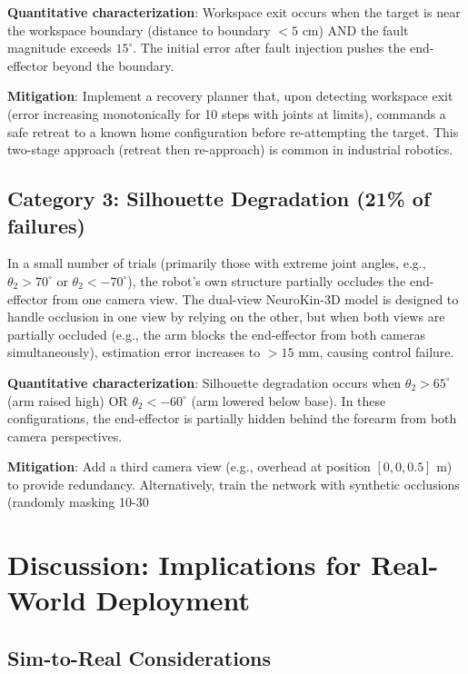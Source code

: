 \documentclass[12pt,a4paper,oneside]{report}
\begin{document}
\textbf{Quantitative characterization}: Workspace exit occurs when the target is near the workspace boundary (distance to boundary $< 5$ cm) AND the fault magnitude exceeds $15^\circ$. The initial error after fault injection pushes the end-effector beyond the boundary.

\textbf{Mitigation}: Implement a recovery planner that, upon detecting workspace exit (error increasing monotonically for 10 steps with joints at limits), commands a safe retreat to a known home configuration before re-attempting the target. This two-stage approach (retreat then re-approach) is common in industrial robotics.

\subsection{Category 3: Silhouette Degradation (21\% of failures)}

In a small number of trials (primarily those with extreme joint angles, e.g., $\theta_2 > 70^\circ$ or $\theta_2 < -70^\circ$), the robot's own structure partially occludes the end-effector from one camera view. The dual-view NeuroKin-3D model is designed to handle occlusion in one view by relying on the other, but when both views are partially occluded (e.g., the arm blocks the end-effector from both cameras simultaneously), estimation error increases to $>15$ mm, causing control failure.

\textbf{Quantitative characterization}: Silhouette degradation occurs when $\theta_2 > 65^\circ$ (arm raised high) OR $\theta_2 < -60^\circ$ (arm lowered below base). In these configurations, the end-effector is partially hidden behind the forearm from both camera perspectives.

\textbf{Mitigation}: Add a third camera view (e.g., overhead at position $[0, 0, 0.5]$ m) to provide redundancy. Alternatively, train the network with synthetic occlusions (randomly masking 10-30%

\section{Discussion: Implications for Real-World Deployment}

\subsection{Sim-to-Real Considerations}
\end{document}

